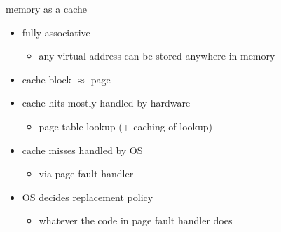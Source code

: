 \begin{frame}{memory as a cache}
    \begin{itemize}
    \item fully associative
        \begin{itemize}
        \item any virtual address can be stored anywhere in memory
        \end{itemize}
    \item cache block $\approx$ page
    \item cache hits mostly handled by hardware
        \begin{itemize}
        \item page table lookup (+ caching of lookup)
        \end{itemize}
    \item cache misses handled by OS
        \begin{itemize}
        \item via page fault handler
        \end{itemize}
    \item OS decides replacement policy
        \begin{itemize}
        \item whatever the code in page fault handler does
        \end{itemize}
    \end{itemize}
\end{frame}
